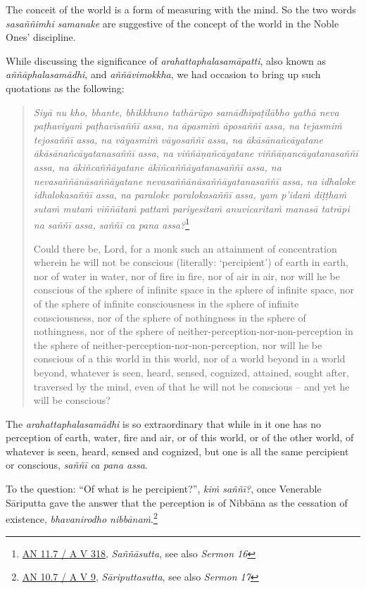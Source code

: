 The conceit of the world is a form of measuring with the mind. So the two words \emph{sasaññimhi samanake} are suggestive of the concept of the world in the Noble Ones' discipline.

While discussing the significance of \emph{arahattaphalasamāpatti}, also known as \emph{aññāphalasamādhi}, and \emph{aññāvimokkha}, we had occasion to bring up such quotations as the following:

\begin{quote}
\emph{Siyā nu kho, bhante, bhikkhuno tathārūpo samādhipaṭilābho yathā neva paṭhaviyaṁ paṭhavīsaññī assa, na āpasmiṁ āposaññī assa, na tejasmiṁ tejosaññī assa, na vāyasmiṁ vāyosaññī assa, na ākāsānañcāyatane ākāsānañcāyatanasaññī assa, na viññāṇañcāyatane viññāṇancāyatanasaññī assa, na ākiñcaññāyatane ākiñcaññāyatanasaññī assa, na nevasaññānāsaññāyatane nevasaññānāsaññāyatanasaññī assa, na idhaloke idhalokasaññī assa, na paraloke paralokasaññī assa, yam p'idaṁ diṭṭhaṁ sutaṁ mutaṁ viññātaṁ pattaṁ pariyesitaṁ anuvicaritaṁ manasā tatrāpi na saññī assa, saññī ca pana assa?}\footnote{\href{https://suttacentral.net/an11.7/pli/ms}{AN 11.7 / A V 318}, \emph{Saññāsutta}, see also \emph{Sermon 16}}

Could there be, Lord, for a monk such an attainment of concentration wherein he will not be conscious (literally: `percipient') of earth in earth, nor of water in water, nor of fire in fire, nor of air in air, nor will he be conscious of the sphere of infinite space in the sphere of infinite space, nor of the sphere of infinite consciousness in the sphere of infinite consciousness, nor of the sphere of nothingness in the sphere of nothingness, nor of the sphere of neither-perception-nor-non-perception in the sphere of neither-perception-nor-non-perception, nor will he be conscious of a this world in this world, nor of a world beyond in a world beyond, whatever is seen, heard, sensed, cognized, attained, sought after, traversed by the mind, even of that he will not be conscious -- and yet he will be conscious?
\end{quote}

The \emph{arahattaphalasamādhi} is so extraordinary that while in it one has no perception of earth, water, fire and air, or of this world, or of the other world, of whatever is seen, heard, sensed and cognized, but one is all the same percipient or conscious, \emph{saññī ca pana assa}.

To the question: ``Of what is he percipient?'', \emph{kiṁ saññī?}, once Venerable Sāriputta gave the answer that the perception is of Nibbāna as the cessation of existence, \emph{bhavanirodho nibbānaṁ}.\footnote{\href{https://suttacentral.net/an10.7/pli/ms}{AN 10.7 / A V 9}, \emph{Sāriputtasutta}, see also \emph{Sermon 17}}

